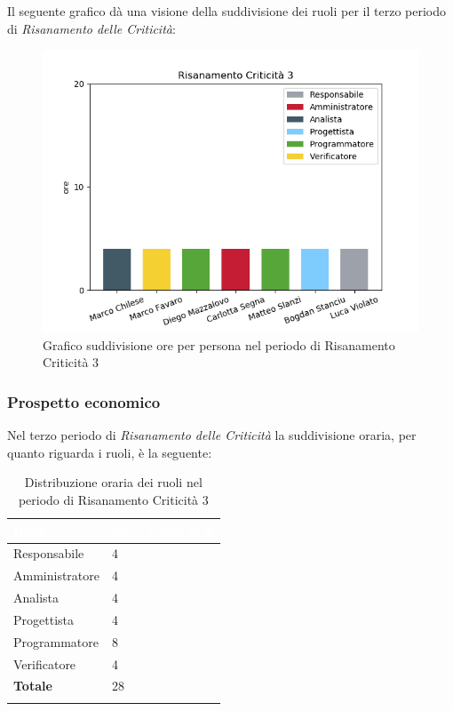 Il seguente grafico dà una visione della suddivisione dei ruoli per il terzo periodo di  \textit{Risanamento delle Criticità}:\begin{figure}[H]
	\centering
	\includegraphics[width=1\linewidth]{./images/fig_rc3.png}
	\caption{Grafico suddivisione ore per persona nel periodo di Risanamento Criticità 3}
	\label{fig:grafico suddivione ruoli rc3}
\end{figure}

\subsubsection{Prospetto economico}
Nel terzo periodo di \textit{Risanamento delle Criticità} la suddivisione oraria, per quanto riguarda i ruoli, è la seguente: 

\begin{longtable}{| C{.30\textwidth}| C{.15\textwidth}| C{.20\textwidth}|}
	\hline
	\textbf{\textcolor{white}{Ruolo}} & \textbf{\textcolor{white}{Ore}} & \textbf{\textcolor{white}{Costo 	in \euro}} \\
	\hline 
	Responsabile & 4 &  \\
	\hline
	Amministratore & 4 &  \\
	\hline
	Analista & 4 &  \\
	\hline
	Progettista & 4 & \\
	\hline
	Programmatore & 8 &  \\
	\hline 
	Verificatore & 4 &  \\
	\hline
	\textbf{Totale} & 28 &  \\
	\hline 


\caption{Distribuzione oraria dei ruoli nel periodo di Risanamento Criticità 3}
\label{Distribuzione oraria rc3}
\end{longtable}

